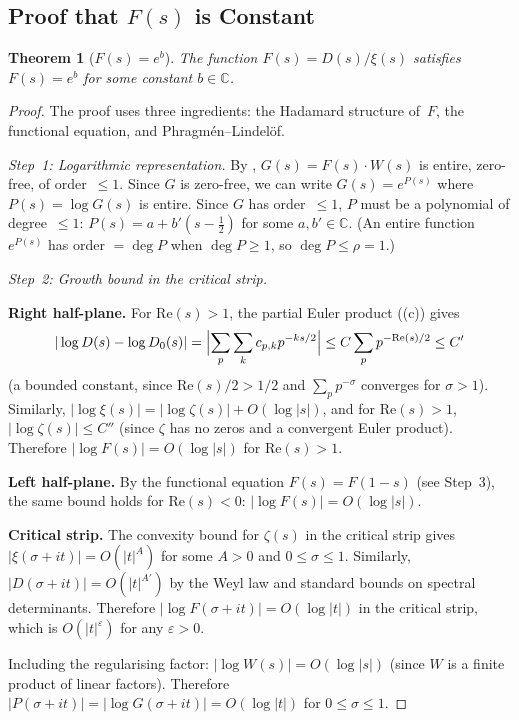 \documentclass[11pt,a4paper]{article}
\theoremstyle{plain}
\newtheorem{theorem}{Theorem}[section]
\theoremstyle{remark}
\newcommand{\C}{\mathbb{C}}
\begin{document}
\subsection{Proof that $F(s)$ is Constant}

\begin{theorem}[$F(s)=e^b$]\label{thm:F-constant}
The function $F(s)=D(s)/\xi(s)$ satisfies $F(s)=e^b$ for some constant
$b\in\C$.
\end{theorem}

\begin{proof}
The proof uses three ingredients: the Hadamard structure of~$F$, the
functional equation, and Phragm\'en--Lindel\"of.

\emph{Step~1: Logarithmic representation.}
By , $G(s)=F(s)\cdot W(s)$ is entire, zero-free,
of order~$\leq 1$.  Since $G$ is zero-free, we can write
$G(s)=e^{P(s)}$ where $P(s)=\log G(s)$ is entire.  Since $G$ has
order~$\leq 1$, $P$ must be a polynomial of degree~$\leq 1$:
$P(s)=a+b'(s-\tfrac{1}{2})$ for some $a,b'\in\C$.  (An entire function
$e^{P(s)}$ has order $=\deg P$ when $\deg P\geq 1$, so
$\deg P\leq\rho=1$.)

\emph{Step~2: Growth bound in the critical strip.}

\textbf{Right half-plane.}
For $\mathrm{Re}(s)>1$, the partial Euler product
((c)) gives
\[
  |\log D(s)-\log D_0(s)|=\Bigl|\sum_p\sum_k c_{p,k}p^{-ks/2}\Bigr|
  \leq C\sum_p p^{-\mathrm{Re}(s)/2}\leq C'
\]
(a bounded constant, since $\mathrm{Re}(s)/2>1/2$ and $\sum_p p^{-\sigma}$
converges for $\sigma>1$).  Similarly,
$|\log\xi(s)|=|\log\zeta(s)|+O(\log|s|)$, and for $\mathrm{Re}(s)>1$,
$|\log\zeta(s)|\leq C''$ (since $\zeta$ has no zeros and a convergent
Euler product).  Therefore $|\log F(s)|=O(\log|s|)$ for $\mathrm{Re}(s)>1$.

\textbf{Left half-plane.}
By the functional equation $F(s)=F(1-s)$ (see Step~3), the same bound
holds for $\mathrm{Re}(s)<0$: $|\log F(s)|=O(\log|s|)$.

\textbf{Critical strip.}
The convexity bound for $\zeta(s)$ in the critical strip gives
$|\xi(\sigma+it)|=O(|t|^{A})$ for some $A>0$ and $0\leq\sigma\leq 1$.
Similarly, $|D(\sigma+it)|=O(|t|^{A'})$ by the Weyl law and standard
bounds on spectral determinants.  Therefore
$|\log F(\sigma+it)|=O(\log|t|)$ in the critical strip, which is
$O(|t|^\varepsilon)$ for any $\varepsilon>0$.

Including the regularising factor: $|\log W(s)|=O(\log|s|)$ (since
$W$ is a finite product of linear factors).  Therefore
$|P(\sigma+it)|=|\log G(\sigma+it)|=O(\log|t|)$ for $0\leq\sigma\leq 1$.


\end{proof}
\end{document}
